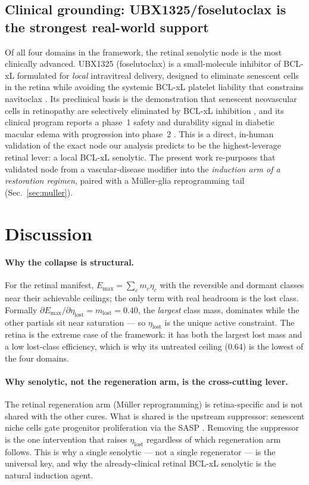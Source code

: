 \documentclass[11pt,a4paper]{article}
\begin{document}
\subsection{Clinical grounding: UBX1325/foselutoclax is the strongest real-world support}
\label{sec:ubx}
Of all four domains in the framework, the retinal senolytic node is the most clinically advanced.
UBX1325 (foselutoclax) is a small-molecule inhibitor of BCL-xL formulated for \emph{local}
intravitreal delivery, designed to eliminate senescent cells in the retina while avoiding the
systemic BCL-xL platelet liability that constrains navitoclax \citep{he2020}. Its preclinical
basis is the demonstration that senescent neovascular cells in retinopathy are selectively
eliminated by BCL-xL inhibition \citep{crespogarcia2021}, and its clinical program reports a
phase~1 safety and durability signal in diabetic macular edema with progression into phase~2
\citep{crespodawid2024}. This is a direct, in-human validation of the exact node our analysis
predicts to be the highest-leverage retinal lever: a local BCL-xL senolytic. The present work
re-purposes that validated node from a vascular-disease modifier into the \emph{induction arm of
a restoration regimen}, paired with a M\"uller-glia reprogramming tail (Sec.~\ref{sec:muller}).

\section{Discussion}
\label{sec:discussion}
\paragraph{Why the collapse is structural.} For the retinal manifest, $E_{\max}=\sum_c m_c\eta_c$
with the reversible and dormant classes near their achievable ceilings; the only term with real
headroom is the lost class. Formally $\partial E_{\max}/\partial\eta_{\text{lost}}=m_{\text{lost}}=0.40$,
the \emph{largest} class mass, dominates while the other partials sit near saturation --- so
$\eta_{\text{lost}}$ is the unique active constraint. The retina is the extreme case of the
framework: it has both the largest lost mass and a low lost-class efficiency, which is why its
untreated ceiling ($0.64$) is the lowest of the four domains.

\paragraph{Why senolytic, not the regeneration arm, is the cross-cutting lever.} The retinal
regeneration arm (M\"uller reprogramming) is retina-specific and is not shared with the other
cures. What is shared is the upstream suppressor: senescent niche cells gate progenitor
proliferation via the SASP \citep{moiseeva2023,crespogarcia2021}. Removing the suppressor is the
one intervention that raises $\eta_{\text{lost}}$ regardless of which regeneration arm follows.
This is why a single senolytic --- not a single regenerator --- is the universal key, and why the
already-clinical retinal BCL-xL senolytic is the natural induction agent.
\end{document}
